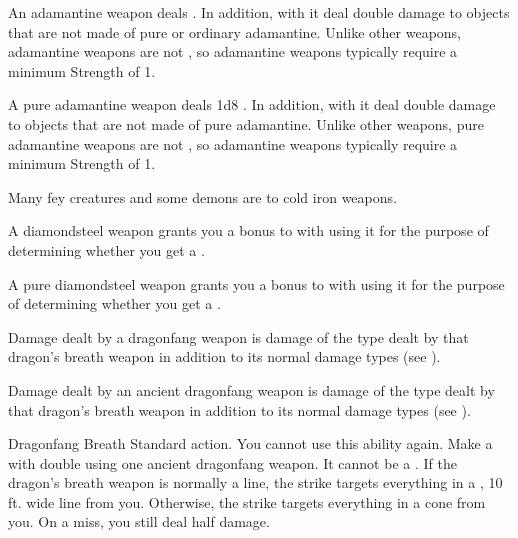        An adamantine weapon deals  .
      In addition,  with it deal double damage to objects that are not made of pure or ordinary adamantine.
      Unlike other weapons, adamantine weapons are not , so  adamantine weapons typically require a minimum Strength of 1.

       A pure adamantine weapon deals \plus1d8 .
      In addition,  with it deal double damage to objects that are not made of pure adamantine.
      Unlike other weapons, pure adamantine weapons are not , so  adamantine weapons typically require a minimum Strength of 1.

       Many fey creatures and some demons are  to cold iron weapons.

       A diamondsteel weapon grants you a  bonus to  with  using it for the purpose of determining whether you get a .

       A pure diamondsteel weapon grants you a  bonus to  with  using it for the purpose of determining whether you get a .

       Damage dealt by a dragonfang weapon is damage of the type dealt by that dragon's breath weapon in addition to its normal damage types (see ).

       Damage dealt by an ancient dragonfang weapon is damage of the type dealt by that dragon's breath weapon in addition to its normal damage types (see ).
      \begin{activeability}{Dragonfang Breath}
        \abilityusagetime Standard action.
        \abilitycost You  cannot use this ability again.
        \rankline
        Make a  with double  using one ancient dragonfang weapon.
        It cannot be a .
        If the dragon's breath weapon is normally a line, the strike targets everything in a \arealarge, 10 ft. wide line from you.
        Otherwise, the strike targets everything in a \areamed cone from you.
        On a miss, you still deal half damage.
      \end{activeability}

